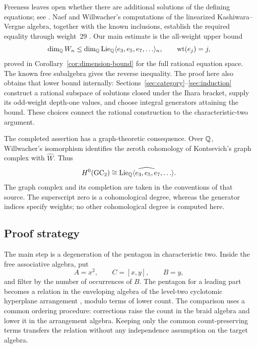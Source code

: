 Freeness leaves open whether there are additional solutions of the
defining equations; see \cite[Section~9]{Willwacher}.
Naef and Willwacher's computations of the linearized
Kashiwara--Vergne algebra, together with the known inclusions,
establish the required equality through weight~29
\cite[Theorem~5 and Corollary~7]{NaefWillwacher}.
Our main estimate is the all-weight upper bound
\[
 \dim_{\mathbb Q}W_n\leq
 \dim_{\mathbb Q}\operatorname{Lie}_{\mathbb Q}\langle e_3,e_5,e_7,\ldots\rangle_n,
 \qquad \operatorname{wt}(e_j)=j,
\]
proved in Corollary~\ref{cor:dimension-bound} for the full rational
equation space.  The known free subalgebra gives the reverse inequality.
The proof here also obtains that lower bound internally:
Sections~\ref{sec:category}--\ref{sec:induction} construct a rational
subspace of solutions closed under the Ihara bracket, supply its
odd-weight depth-one values, and choose integral generators attaining
the bound.  These choices connect the rational construction to the
characteristic-two argument.

The completed assertion has a graph-theoretic consequence.  Over
\(\mathbb Q\), Willwacher's isomorphism
\cite[Theorem~1.1]{Willwacher} identifies the zeroth cohomology of
Kontsevich's graph complex with \(\widehat W\).  Thus
\[
 H^0(\mathrm{GC}_2)\cong
 \widehat{\operatorname{Lie}_{\mathbb Q}\langle e_3,e_5,e_7,\ldots\rangle}.
\]
The graph complex and its completion are taken in the conventions of
that source.  The superscript zero is a cohomological degree, whereas
the generator indices specify weights; no other cohomological degree
is computed here.

\subsection{Proof strategy}

The main step is a degeneration of the pentagon in characteristic two.
Inside the free associative algebra, put
\[
 A=x^2,\qquad C=[x,y],\qquad B=y,
\]
and filter by the number of occurrences of \(B\).
The pentagon for a leading part becomes a relation in the enveloping
algebra of the level-two cyclotomic hyperplane arrangement
\cite[Section~1.4]{Enriquez}, modulo terms of lower count.
The comparison uses a common ordering procedure: corrections
raise the count in the braid algebra and lower it in the arrangement
algebra.  Keeping only the common count-preserving terms transfers the
relation without any independence assumption on the target algebra.

